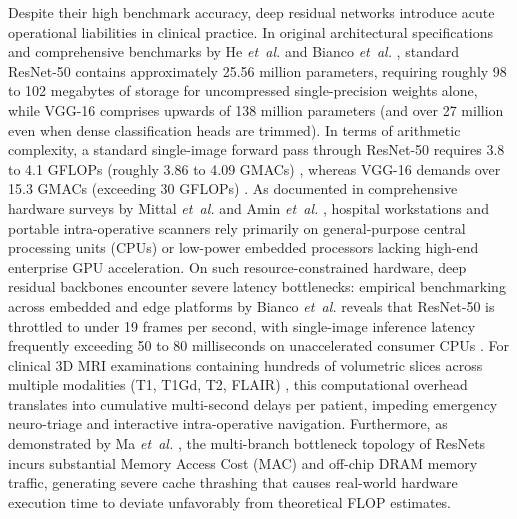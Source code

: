 ﻿\documentclass[journal]{IEEEtran}
\begin{document}
Despite their high benchmark accuracy, deep residual networks introduce acute operational liabilities in clinical practice. In original architectural specifications and comprehensive benchmarks by He \emph{et~al.} \cite{14} and Bianco \emph{et~al.} \cite{60}, standard ResNet-50 contains approximately 25.56 million parameters, requiring roughly 98 to 102 megabytes of storage for uncompressed single-precision weights alone, while VGG-16 \cite{39} comprises upwards of 138 million parameters (and over 27 million even when dense classification heads are trimmed). In terms of arithmetic complexity, a standard single-image forward pass through ResNet-50 requires 3.8 to 4.1 GFLOPs (roughly 3.86 to 4.09 GMACs) \cite{14, 60}, whereas VGG-16 demands over 15.3 GMACs (exceeding 30 GFLOPs) \cite{39, 60}. As documented in comprehensive hardware surveys by Mittal \emph{et~al.} \cite{33} and Amin \emph{et~al.} \cite{56}, hospital workstations and portable intra-operative scanners rely primarily on general-purpose central processing units (CPUs) or low-power embedded processors lacking high-end enterprise GPU acceleration. On such resource-constrained hardware, deep residual backbones encounter severe latency bottlenecks: empirical benchmarking across embedded and edge platforms by Bianco \emph{et~al.} \cite{60} reveals that ResNet-50 is throttled to under 19 frames per second, with single-image inference latency frequently exceeding 50 to 80 milliseconds on unaccelerated consumer CPUs \cite{33, 60, 61}. For clinical 3D MRI examinations containing hundreds of volumetric slices across multiple modalities (T1, T1Gd, T2, FLAIR) \cite{2, 28}, this computational overhead translates into cumulative multi-second delays per patient, impeding emergency neuro-triage and interactive intra-operative navigation. Furthermore, as demonstrated by Ma \emph{et~al.} \cite{32}, the multi-branch bottleneck topology of ResNets incurs substantial Memory Access Cost (MAC) and off-chip DRAM memory traffic, generating severe cache thrashing that causes real-world hardware execution time to deviate unfavorably from theoretical FLOP estimates.
\end{document}
